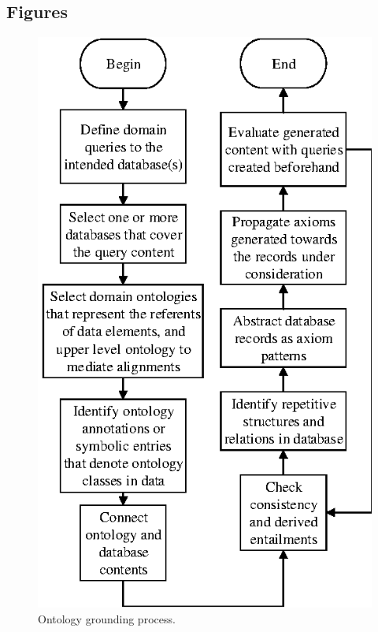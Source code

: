 \documentclass{bmcart}
\begin{document}
\begin{backmatter}



\section*{Figures}

\begin{figure}[!h]
	\centering
	\includegraphics{./PIC/process}
	\caption{Ontology grounding process.}
	\label{fig:process}
\end{figure}



\end{backmatter}
\end{document}
